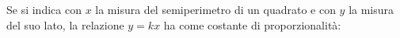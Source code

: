 Se si indica con $x$ la misura del semiperimetro di un quadrato 
e con $y$ la misura del suo lato, la relazione $y = kx$ ha
come costante di proporzionalità: